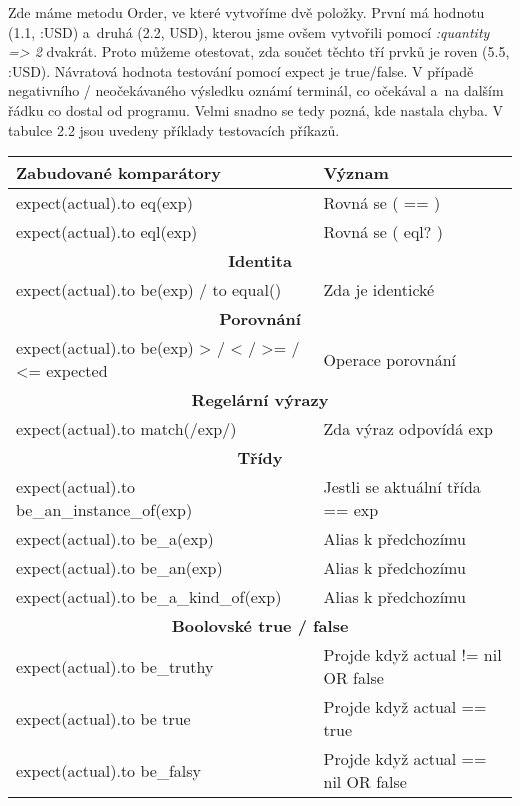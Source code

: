 \par Zde máme metodu Order, ve které vytvoříme dvě položky. První má hodnotu (1.1, :USD) a~druhá (2.2, USD), kterou jsme ovšem vytvořili pomocí \textit{:quantity => 2} dvakrát. Proto můžeme otestovat, zda součet těchto tří prvků je roven (5.5, :USD). Návratová hodnota testování pomocí expect je true/false. V případě negativního / neočekávaného výsledku oznámí terminál, co očekával a~na dalším řádku co dostal od programu. Velmi snadno se tedy pozná, kde nastala chyba. V tabulce 2.2 jsou uvedeny příklady testovacích příkazů.

\begin{center}
\begin{longtable}{| m{} | m{} |} 
\hline
 \textbf{Zabudované komparátory} & \textbf{Význam} \\ 
 \hline
 expect(actual).to eq(exp) & Rovná se ( == ) \\
 \hline
 expect(actual).to eql(exp) & Rovná se ( eql? ) \\
 \hline
 \multicolumn{2}{||c||}{\textbf{Identita}}\\
 \hline
 expect(actual).to be(exp) / to equal() & Zda je identické\\
 \hline
 \multicolumn{2}{||c||}{\textbf{Porovnání}}\\
 \hline
 expect(actual).to be(exp) > / < / >= / <= expected & Operace porovnání \\
 \hline
 \multicolumn{2}{||c||}{\textbf{Regelární výrazy}}\\
 \hline
 expect(actual).to match(/exp/) & Zda výraz odpovídá exp \\
 \hline
 \multicolumn{2}{||c||}{\textbf{Třídy}}\\
 \hline
 expect(actual).to be\_an\_instance\_of(exp) & Jestli se aktuální třída == exp \\
 \hline
 expect(actual).to be\_a(exp) & Alias k předchozímu \\
 \hline
 expect(actual).to be\_an(exp) & Alias k předchozímu  \\
 \hline
 expect(actual).to be\_a\_kind\_of(exp) & Alias k předchozímu  \\
 \hline
 \multicolumn{2}{||c||}{\textbf{Boolovské true / false}}\\
 \hline
 expect(actual).to be\_truthy  & Projde když actual != nil OR false\\
 \hline
 expect(actual).to be true    & Projde když actual == true \\
 \hline
 expect(actual).to be\_falsy   & Projde když actual == nil OR false \\

\end{longtable}
\end{center}
